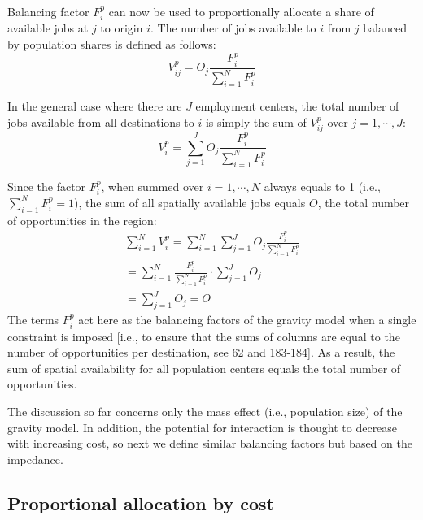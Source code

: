 \documentclass[10pt,letterpaper]{article}
\begin{document}
Balancing factor \(F^p_{i}\) can now be used to proportionally allocate
a share of available jobs at \(j\) to origin \(i\). The number of jobs
available to \(i\) from \(j\) balanced by population shares is defined
as follows: \[
V^p_{ij} = O_j\frac{F^p_{i}}{\sum_{i=1}^N F^p_{i}}
\]

In the general case where there are \(J\) employment centers, the total
number of jobs available from all destinations to \(i\) is simply the
sum of \(V^p_{ij}\) over \(j=1,\cdots, J\): \[
V^p_{i} = \sum_{j=1}^J O_j\frac{F^p_{i}}{\sum_{i=1}^N F^p_{i}}
\]

Since the factor \(F^p_{i}\), when summed over \(i=1,\cdots,N\) always
equals to 1 (i.e., \(\sum_{i=1}^{N} F^p_{i} = 1\)), the sum of all
spatially available jobs equals \(O\), the total number of opportunities
in the region: \[
\begin{array}{l}
\sum_{i=1}^N V^p_i =\sum_{i=1}^N\sum_{j=1}^JO_j\frac{F^p_{i}}{\sum_{i=1}^N F^p_{i}}\\
=\sum_{i=1}^N \frac{F^p_{i}}{\sum_{i=1}^N F^p_{i}}\cdot\sum_{j=1}^JO_j\\
=\sum_{j=1}^J O_j = O
\end{array}
\] The terms \(F^p_{i}\) act here as the balancing factors of the
gravity model when a single constraint is imposed {[}i.e., to ensure
that the sums of columns are equal to the number of opportunities per
destination, see 62 and 183-184{]}. As a result, the sum of spatial
availability for all population centers equals the total number of
opportunities.

The discussion so far concerns only the mass effect (i.e., population
size) of the gravity model. In addition, the potential for interaction
is thought to decrease with increasing cost, so next we define similar
balancing factors but based on the impedance.

\hypertarget{proportional-allocation-by-cost}{%
\subsection{Proportional allocation by
cost}\label{proportional-allocation-by-cost}}
\end{document}
